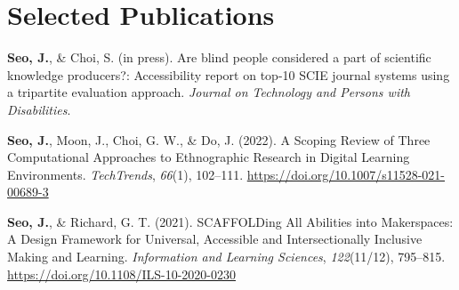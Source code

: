 \documentclass[11pt,a4paper,]{awesome-cv}
\begin{document}
\begin{cventries}
    \vspace{-4.0mm}
    \vspace{-4.0mm}
\end{cventries}

\hypertarget{selected-publications}{%
    \section{Selected Publications}\label{selected-publications}}

\hypertarget{refs_selected}{}
\leavevmode{}%
\textbf{Seo, J.}, \& Choi, S. (in press). Are blind people considered a
part of scientific knowledge producers?: Accessibility report on top-10
SCIE journal systems using a tripartite evaluation approach.
\emph{Journal on Technology and Persons with Disabilities}.

\leavevmode{}%
\textbf{Seo, J.}, Moon, J., Choi, G. W., \& Do, J. (2022). A {Scoping
        Review} of {Three Computational Approaches} to {Ethnographic Research}
in {Digital Learning Environments}. \emph{TechTrends}, \emph{66}(1),
102--111. \url{https://doi.org/10.1007/s11528-021-00689-3}

\leavevmode{}%
\textbf{Seo, J.}, \& Richard, G. T. (2021). {SCAFFOLDing All Abilities}
into {Makerspaces}: {A Design Framework} for {Universal}, {Accessible}
and {Intersectionally Inclusive Making} and {Learning}.
\emph{Information and Learning Sciences}, \emph{122}(11/12), 795--815.
\url{https://doi.org/10.1108/ILS-10-2020-0230}
\end{document}
